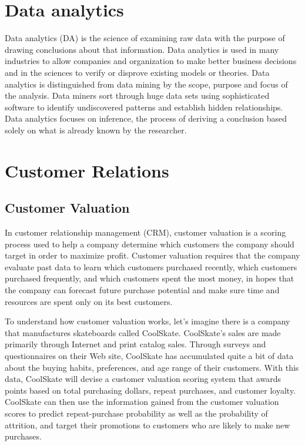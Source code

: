 

\section{Data analytics}
Data analytics (DA) is the science of examining raw data with the purpose of drawing conclusions about that information. Data analytics is used in many industries to allow companies and organization to make better business decisions and in the sciences to verify or disprove existing models or theories. Data analytics is distinguished from data mining by the scope, purpose and focus of the analysis. Data miners sort through huge data sets using sophisticated software to identify undiscovered patterns and establish hidden relationships. Data analytics focuses on inference, the process of deriving a conclusion based solely on what is already known by the researcher.




\section{Customer Relations}

\subsection{Customer Valuation}
In customer relationship management (CRM), customer valuation is a scoring process used to help a company determine which customers the company should target in order to maximize profit. Customer valuation requires that the company evaluate past data to learn which customers purchased recently, which customers purchased frequently, and which customers spent the most money, in hopes that the company can forecast future purchase potential and make sure time and resources are spent only on its best customers.


To understand how customer valuation works, let's imagine there is a company that manufactures skateboards called CoolSkate. CoolSkate's sales are made primarily through Internet and print catalog sales. Through surveys and questionnaires on their Web site, CoolSkate has accumulated quite a bit of data about the buying habits, preferences, and age range of their customers. With this data, CoolSkate will devise a customer valuation scoring system that awards points based on total purchasing dollars, repeat purchases, and customer loyalty. CoolSkate can then use the information gained from the customer valuation scores to predict repeat-purchase probability as well as the probability of attrition, and target their promotions to customers who are likely to make new purchases.

